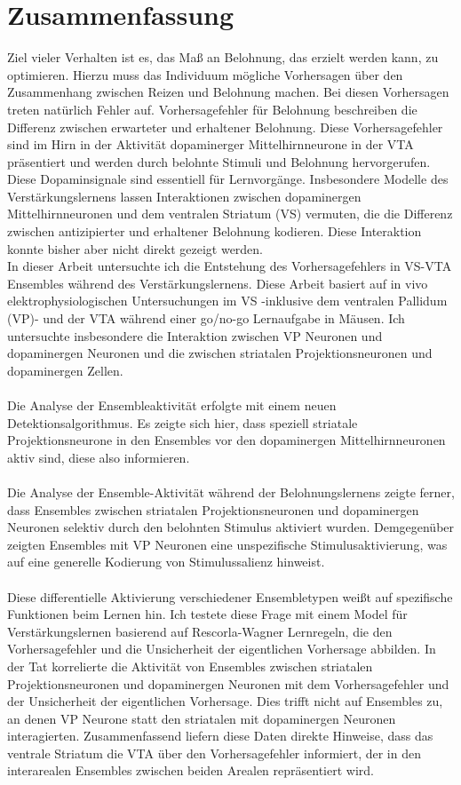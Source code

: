\section*{Zusammenfassung}
Ziel vieler Verhalten ist es, das Maß an Belohnung, das erzielt werden kann, zu optimieren. Hierzu muss das Individuum mögliche Vorhersagen über den Zusammenhang zwischen Reizen und Belohnung machen.  Bei diesen Vorhersagen treten natürlich Fehler auf. Vorhersagefehler für Belohnung beschreiben die Differenz zwischen erwarteter und erhaltener Belohnung. Diese Vorhersagefehler sind im Hirn in der Aktivität dopaminerger Mittelhirnneurone in der VTA präsentiert und werden durch belohnte Stimuli und Belohnung hervorgerufen. Diese Dopaminsignale sind essentiell für Lernvorgänge. Insbesondere Modelle des Verstärkungslernens lassen Interaktionen zwischen dopaminergen Mittelhirnneuronen und dem ventralen Striatum (VS) vermuten, die die Differenz zwischen antizipierter und erhaltener Belohnung kodieren. Diese Interaktion konnte bisher aber nicht direkt gezeigt werden.\\In dieser Arbeit untersuchte ich die Entstehung des Vorhersagefehlers in VS-VTA Ensembles während des Verstärkungslernens. Diese Arbeit basiert auf in vivo elektrophysiologischen Untersuchungen im VS -inklusive dem ventralen Pallidum (VP)- und der VTA während einer go/no-go Lernaufgabe in Mäusen. Ich untersuchte insbesondere die Interaktion zwischen VP Neuronen und dopaminergen Neuronen und die zwischen striatalen Projektionsneuronen und dopaminergen Zellen.\\\\Die Analyse der Ensembleaktivität erfolgte mit einem neuen Detektionsalgorithmus. Es zeigte sich hier, dass speziell striatale Projektionsneurone in den Ensembles vor den dopaminergen Mittelhirnneuronen aktiv sind, diese also informieren.\\\\Die Analyse der Ensemble-Aktivität während der Belohnungslernens zeigte ferner, dass Ensembles zwischen striatalen Projektionsneuronen und dopaminergen Neuronen selektiv durch den belohnten Stimulus aktiviert wurden. Demgegenüber zeigten Ensembles mit VP Neuronen eine unspezifische Stimulusaktivierung, was auf eine generelle Kodierung von Stimulussalienz hinweist.\\\\Diese differentielle Aktivierung verschiedener Ensembletypen weißt auf spezifische Funktionen beim Lernen hin. Ich testete diese Frage mit einem Model für Verstärkungslernen basierend auf Rescorla-Wagner Lernregeln, die den Vorhersagefehler und die Unsicherheit der eigentlichen Vorhersage abbilden. In der Tat korrelierte die Aktivität von Ensembles zwischen striatalen Projektionsneuronen und dopaminergen Neuronen mit dem Vorhersagefehler und der Unsicherheit der eigentlichen Vorhersage. Dies trifft nicht auf Ensembles zu, an denen VP Neurone statt den striatalen mit dopaminergen Neuronen interagierten. Zusammenfassend liefern diese Daten direkte Hinweise, dass das ventrale Striatum die VTA über den Vorhersagefehler informiert, der in den interarealen Ensembles zwischen beiden Arealen repräsentiert wird.
